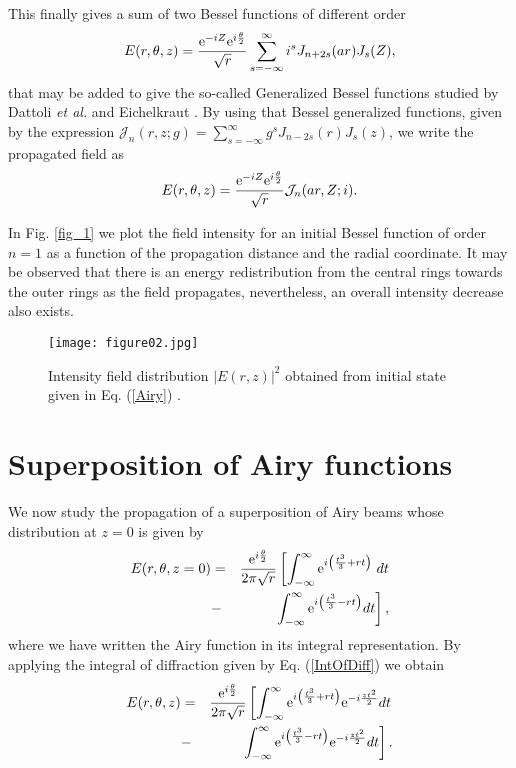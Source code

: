 \documentclass[aps,pra,reprint,superscriptaddress]{revtex4-2}
\begin{document}
This finally gives a sum of two Bessel functions of different order 
\begin{equation} \label{genebessel}
   E(r,\theta,z)=\frac{\hbox{e}^{{\color{black}-}iZ}\hbox{e}^{i\frac{\theta}{2}}}{\sqrt{r}}\sum_{s=-\infty}^{\infty}i^sJ_{n+2s}(ar)J_s({\color{black}Z}),
 \end{equation}
that may be added to give the so-called Generalized
Bessel functions studied by Dattoli {\it et al.} \cite{Dattoli1989,Dattoli1991} and Eichelkraut \cite{Toni2014}. By using that Bessel generalized functions, given by the expression $\mathcal{J}_n(r,z;g)=\sum_{s=-\infty}^{\infty}g^sJ_{n-2s}(r)J_s(z)$, we write the propagated field as
%
%
\begin{equation}
   E(r,\theta,z)=\frac{\hbox{e}^{{\color{black}-}iZ}\hbox{e}^{i\frac{\theta}{2}}}{\sqrt{r}}\mathcal{J}_n(ar,{\color{black}Z};i).
 \end{equation}
 
 In Fig. \ref{fig_1} we plot the field intensity for an initial Bessel function of order $n=1$ as a function of the propagation distance and the radial coordinate. It may be observed that there is an energy redistribution from the central rings towards the outer rings as the field propagates, nevertheless, an overall intensity decrease also exists. 
\begin{figure}
	\begin{center}
	\texttt{[image: figure02.jpg]} 
		\caption{Intensity field distribution $\vert E(r,z)\vert^2$ obtained from initial state given in Eq.  (\ref{Airy}) .} 
		\label{fig_2}
	\end{center}
\end{figure}



\section{Superposition of Airy functions} We now study the propagation of a superposition of Airy beams \cite{PhysRevLett.99.213901,Vaveliuk2014} whose distribution at $z=0$ is given by
%
%
\begin{eqnarray}\label{Airy}\nonumber
 E(r,\theta,z=0)&=&\frac{\hbox{e}^{i\frac{\theta}{2}}}{2\pi\sqrt{r}}\left[\int_{-\infty}^{\infty}\hbox{e}^{i\left(\frac{t^{3}}{3}+rt\right)}\right. dt\\ &-& \left.\int_{-\infty}^{\infty}\hbox{e}^{i\left(\frac{t^{3}}{3}-rt\right)}dt\right],
\end{eqnarray}
%
%
where we have written the Airy function in its integral representation. By applying the integral of diffraction given by Eq. (\ref{IntOfDiff}) we obtain
%
%
\begin{eqnarray}\nonumber
 E(r,\theta,z)&=&\frac{\hbox{e}^{i\frac{\theta}{2}}}{2\pi\sqrt{r}}\left[\int_{-\infty}^{\infty}\hbox{e}^{i\left(\frac{t^{3}}{3}+rt\right)}\hbox{e}^{{\color{black}-}i\frac{zt^2}{2}}dt\right.\\ &-&\left.\int_{-\infty}^{\infty}\hbox{e}^{i\left(\frac{t^{3}}{3}-rt\right)}\hbox{e}^{{\color{black}-}i\frac{zt^2}{2}}dt\right].
\end{eqnarray}
\end{document}
